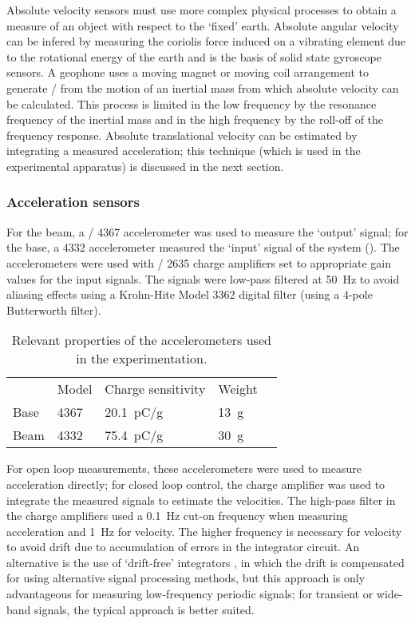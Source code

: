 \documentclass[11pt,a4paper]{memoir}
\begin{document}
Absolute velocity sensors must use more complex physical processes to obtain a measure of an object with respect to the `fixed' earth.
Absolute angular velocity can be infered by measuring the coriolis force induced on a vibrating element due to the rotational energy of the earth \cite{konno1996} and is the basis of solid state gyroscope sensors.
A geophone uses a moving magnet or moving coil arrangement to generate \backemf/ from the motion of an inertial mass \cite{oome2009-saa} from which absolute velocity can be calculated.
This process is limited in the low frequency by the resonance frequency of the inertial mass and in the high frequency by the roll-off of the frequency response.
Absolute translational velocity can be estimated by integrating a measured acceleration; this technique (which is used in the experimental apparatus) is discussed in the next section.

\subsubsection{Acceleration sensors}

For the beam, a \BnK/ 4367 accelerometer was used to measure the `output' signal; for the base, a 4332 accelerometer measured the `input' signal of the system ().
The accelerometers were used with \BnK/ 2635 charge amplifiers set to appropriate gain values for the input signals.
The signals were low-pass filtered at \SI{50}{Hz} to avoid aliasing effects using a Krohn-Hite Model 3362 digital filter (using a 4-pole Butterworth filter).

\begin{table}
  \caption{Relevant properties of the accelerometers used in the experimentation.}
  \begin{tabular}{@{}lllll@{}}
    \toprule
           & Model & Charge sensitivity & Weight \\
    \cmidrule{2-4}
      Base & 4367 & \SI{20.1}{pC/g} & \SI{13}{g} \\
      Beam & 4332 & \SI{75.4}{pC/g} & \SI{30}{g} \\
    \bottomrule
  \end{tabular}
\end{table}


For open loop measurements, these accelerometers were used to measure acceleration directly; for closed loop control, the charge amplifier was used to integrate the measured signals to estimate the velocities.
The high-pass filter in the charge amplifiers used a \SI{0.1}{Hz} cut-on frequency when measuring acceleration and \SI{1}{Hz} for velocity.
The higher frequency is necessary for velocity to avoid drift due to accumulation of errors in the integrator circuit.
An alternative is the use of `drift-free' integrators \cite{gavin1998}, in which the drift is compensated for using alternative signal processing methods, but this approach is only advantageous for measuring low-frequency periodic signals; for transient or wide-band signals, the typical approach is better suited.
\end{document}
